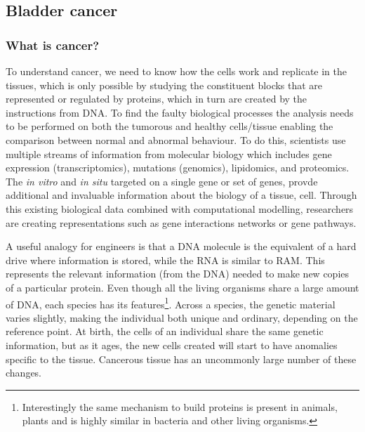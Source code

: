 
\subsection{Bladder cancer} \label{s:lit:biology}

\vspace{3mm}
\vspace{3mm}

\subsubsection{What is cancer?}

To understand cancer, we need to know how the cells work and replicate in the tissues, which is only possible by studying the constituent blocks that are represented or regulated by proteins, which in turn are created by the instructions from DNA. To find the faulty biological processes the analysis needs to be performed on both the tumorous and healthy cells/tissue enabling the comparison between normal and abnormal behaviour. To do this, scientists use multiple streams of information from molecular biology which includes gene expression (transcriptomics), mutations (genomics), lipidomics, and proteomics. The \textit{in vitro} and \textit{in situ} targeted on a single gene or set of genes, provde additional and invaluable information about the biology of a tissue, cell. Through this existing biological data combined with computational modelling, researchers are creating representations such as gene interactions networks or gene pathways. 

A useful analogy for engineers is that a DNA molecule is the equivalent of a hard drive where information is stored, while the RNA is similar to RAM. This represents the relevant information (from the DNA) needed to make new copies of a particular protein. Even though all the living organisms share a large amount of DNA, each species has its features\footnote{Interestingly the same mechanism to build proteins is present in animals, plants and is highly similar in bacteria and other living organisms.}. Across a species, the genetic material varies slightly, making the individual both unique and ordinary, depending on the reference point. At birth, the cells of an individual share the same genetic information, but as it ages, the new cells created will start to have anomalies specific to the tissue. Cancerous tissue has an uncommonly large number of these changes.

